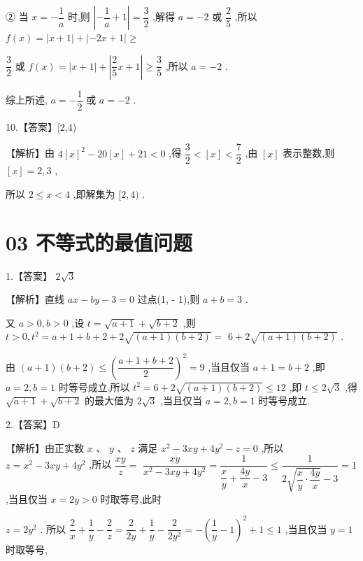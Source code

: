 \documentclass[10pt]{article}
\begin{document}
② 当 $x =  - \dfrac{1}{a}$ 时,则 $\left| {-\dfrac{1}{a} + 1}\right|  = \dfrac{3}{2}$ ,解得 $a =  - 2$ 或 $\dfrac{2}{5}$ ,所以 $f\left( x\right)  = \left| {x + 1}\right|  + \left| {-{2x} + 1}\right|  \geq$

$\dfrac{3}{2}$ 或 $f\left( x\right)  = \left| {x + 1}\right|  + \left| {\dfrac{2}{5}x + 1}\right|  \geq  \dfrac{3}{5}$ ,所以 $a =  - 2$ .

综上所述, $a =  - \dfrac{1}{2}$ 或 $a =  - 2$ .

10.【答案】[2,4)

【解析】由 $4{\left\lbrack  x\right\rbrack  }^{2} - {20}\left\lbrack  x\right\rbrack   + {21} < 0$ ,得 $\dfrac{3}{2} < \left\lbrack  x\right\rbrack   < \dfrac{7}{2}$ ,由 $\left\lbrack  x\right\rbrack$ 表示整数,则 $\left\lbrack  x\right\rbrack   = 2,3$ ,

所以 $2 \leq  x < 4$ ,即解集为 $\lbrack 2,4)$ .

\section*{03 不等式的最值问题}

1.【答案】 $2\sqrt{3}$

【解析】直线 ${ax} - {by} - 3 = 0$ 过点(1, - 1),则 $a + b = 3$ .

又 $a > 0,b > 0$ ,设 $t = \sqrt{a + 1} + \sqrt{b + 2}$ ,则 $t > 0,{t}^{2} = a + 1 + b + 2 + 2\sqrt{\left( {a + 1}\right) \left( {b + 2}\right) } =$  $6 + 2\sqrt{\left( {a + 1}\right) \left( {b + 2}\right) }$ .

由 $\left( {a + 1}\right) \left( {b + 2}\right)  \leq  {\left( \dfrac{a + 1 + b + 2}{2}\right) }^{2} = 9$ ,当且仅当 $a + 1 = b + 2$ ,即 $a = 2,b = 1$ 时等号成立,所以 ${t}^{2} = 6 + 2\sqrt{\left( {a + 1}\right) \left( {b + 2}\right) } \leq  {12}$ ,即 $t \leq  2\sqrt{3}$ ,得 $\sqrt{a + 1} + \sqrt{b + 2}$ 的最大值为 $2\sqrt{3}$ ,当且仅当 $a = 2,b = 1$ 时等号成立.

2.【答案】D

【解析】由正实数 $x\text{ 、 }y\text{ 、 }z$ 满足 ${x}^{2} - {3xy} + 4{y}^{2} - z = 0$ ,所以 $z = {x}^{2} - {3xy} + 4{y}^{2}$ ,所以 $\dfrac{xy}{z} =$  $\dfrac{xy}{{x}^{2} - {3xy} + 4{y}^{2}} = \dfrac{1}{\dfrac{x}{y} + \dfrac{4y}{x} - 3} \leq  \dfrac{1}{2\sqrt{\dfrac{x}{y} \cdot  \dfrac{4y}{x}} - 3} = 1$ ,当且仅当 $x = {2y} > 0$ 时取等号,此时

$z = 2{y}^{2}$ . 所以 $\dfrac{2}{x} + \dfrac{1}{y} - \dfrac{2}{z} = \dfrac{2}{2y} + \dfrac{1}{y} - \dfrac{2}{2{y}^{2}} =  - {\left( \dfrac{1}{y} - 1\right) }^{2} + 1 \leq  1$ ,当且仅当 $y = 1$ 时取等号,
\end{document}
